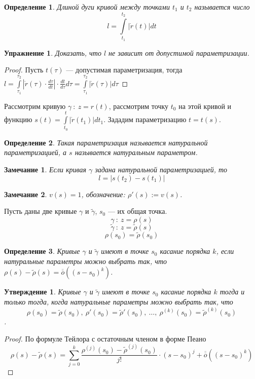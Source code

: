 \documentclass[12pt]{article}
\theoremstyle{plain}
\newtheorem{subtheorem}{Утверждение}[section]
\newtheorem*{exercise}{Упражнение}
\newtheorem{definition}{Определение}[section]
\newtheorem{remark}{Замечание}
\begin{document}
    \begin{definition}
        Длиной дуги кривой между точками $t_1$ и $t_2$ называется число $$l=\int\limits_{t_1}^{t_2}|\dot{r}(t)|dt$$
    \end{definition}
    \begin{exercise}
        Доказать, что $l$ не зависит от допустимой параметризации.
    \end{exercise}
    \begin{proof}
        Пусть $t(\tau)$ --- допустимая параметризация, тогда $l=\int\limits_{\tau_1}^{\tau_2}|\dot{r}(\tau)\cdot\frac{d\tau}{dt}|\cdot\frac{dt}{d\tau}d\tau=\int\limits_{\tau_1}^{\tau_2}|\dot{r}(\tau)|d\tau$
    \end{proof}
    Рассмотрим кривую $\gamma \ : \ z=r(t)$, рассмотрим точку $t_0$ на этой кривой и функцию $s(t)=\int\limits_{t_0}^t|\dot{r}(t_1)|dt_1$. Зададим параметризацию $t=t(s)$.
    \begin{definition}
        Такая параметризация называется натуральной параметризацией, а $s$ называется натуральным параметром.
    \end{definition}
    \begin{remark}
        Если кривая $\gamma$ задана натуральной параметризацией, то $$l=|s(t_2)-s(t_1)|$$
    \end{remark}
    \begin{remark}
        $v(s)=1$, обозначение: $\rho'(s):=v(s)$.
    \end{remark}
    Пусть даны две кривые $\gamma$ и $\tilde{\gamma}$, $s_0$ --- их общая точка.
    $$\gamma \ : \ z=\rho(s)$$
    $$\tilde{\gamma} \ : \ z=\tilde{\rho}(s)$$
    $$\rho(s_0)=\tilde{\rho}(s_0)$$
    \begin{definition}
        Кривые $\gamma$ и $\tilde{\gamma}$ имеют в точке $s_0$ касание порядка $k$, если натуральные параметры можно выбрать так, что $\rho(s)-\tilde{\rho}(s)=\overline{\overline{o}}((s-s_0)^k)$.
    \end{definition}
    \begin{subtheorem}
        Кривые $\gamma$ и $\tilde{\gamma}$ имеют в точке $s_0$ касание порядка $k$ тогда и только тогда, когда натуральные параметры можно выбрать так, что $$\rho(s_0)=\tilde{\rho}(s_0), \ \rho'(s_0)=\tilde{\rho}'(s_0), \ \ldots, \ \rho^{(k)}(s_0)=\tilde{\rho}^{(k)}(s_0)$$.
    \end{subtheorem}
    \begin{proof}
        По формуле Тейлора с остаточным членом в форме Пеано $$\rho(s)-\tilde{\rho}(s)=\sum\limits_{j=0}^k\frac{\rho^{(j)}(s_0)-\tilde{\rho}^{(j)}(s_0)}{j!}\cdot(s-s_0)^j+\overline{\overline{o}}((s-s_0)^k)$$
    \end{proof}
\end{document}
